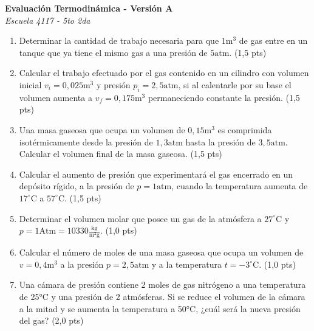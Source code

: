 \documentclass[a4paper,10pt]{article}
\newenvironment{versionexamen}[1]{
  \begin{minipage}[t]{0.48\textwidth}
    \textbf{Evaluación Termodinámica - Versión #1} \\
    \textit{Escuela 4117 - 5to 2da}
    \begin{enumerate}[label=\textbf{\arabic*.}, leftmargin=15pt, topsep=4pt, itemsep=4pt]
      \small
}{
    \end{enumerate}
    \vspace{0.4cm}
  \end{minipage}
}
\begin{document}
\begin{versionexamen}{A}
	\item Determinar la cantidad de trabajo necesaria para que $1\text{m}^3$ de gas entre en un tanque que ya tiene el mismo gas a una presión de $5\text{atm}$. (1,5 pts)
	\item Calcular el trabajo efectuado por el gas contenido en un cilindro con volumen inicial $v_i=0,025\text{m}^3$ y presión $p_i=2,5\text{atm}$, si al calentarle por su base el volumen aumenta a $v_f=0,175\text{m}^3$ permaneciendo constante la presión. (1,5 pts)
	\item Una masa gaseosa que ocupa un volumen de $0,15\text{m}^3$ es comprimida isotérmicamente desde la presión de $1,3\text{atm}$ hasta la presión de $3,5\text{atm}$. Calcular el volumen final de la masa gaseosa. (1,5 pts)
	\item Calcular el aumento de presión que experimentará el gas encerrado en un depósito rígido, a la presión de $p=1\text{atm}$, cuando la temperatura aumenta de $17^\circ$C a $57^\circ$C. (1,5 pts)
	\item Determinar el volumen molar que posee un gas de la atmósfera a $27^\circ$C y $p=1\text{Atm}= 10330\frac{\text{kg}}{\text{m}^2\text{g}}$. (1,0 pts)
	\item Calcular el número de moles de una masa gaseosa que ocupa un volumen de $v=0,4\text{m}^3$ a la presión $p=2,5\text{atm}$ y a la temperatura $t=-3^\circ$C. (1,0 pts)
	\item Una cámara de presión contiene 2 moles de gas nitrógeno a una temperatura de 25°C y una presión de 2 atmósferas. Si se reduce el volumen de la cámara a la mitad y se aumenta la temperatura a 50°C, ¿cuál será la nueva presión del gas? (2,0 pts)
\end{versionexamen}
\hfill
\end{document}
